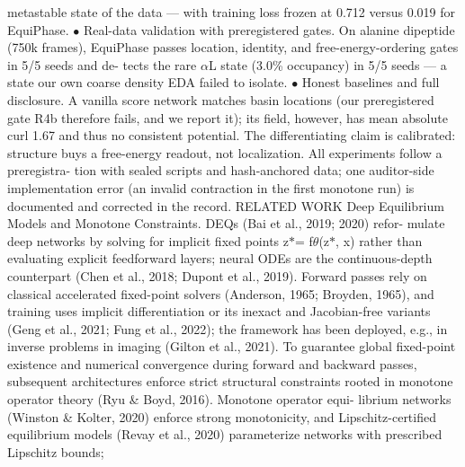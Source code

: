 \documentclass{article}
\begin{document}
metastable state of the data --- with training loss frozen at 0.712 versus 0.019 for EquiPhase.
$\bullet$  Real-data validation with preregistered gates.
On alanine dipeptide (750k frames),
EquiPhase passes location, identity, and free-energy-ordering gates in 5/5 seeds and de-
tects the rare $\alpha$L state (3.0\% occupancy) in 5/5 seeds --- a state our own coarse density
EDA failed to isolate.
$\bullet$  Honest baselines and full disclosure. A vanilla score network matches basin locations
(our preregistered gate R4b therefore fails, and we report it); its field, however, has mean
absolute curl 1.67 and thus no consistent potential. The differentiating claim is calibrated:
structure buys a free-energy readout, not localization. All experiments follow a preregistra-
tion with sealed scripts and hash-anchored data; one auditor-side implementation error (an
invalid contraction in the first monotone run) is documented and corrected in the record.
RELATED WORK
Deep Equilibrium Models and Monotone Constraints.
DEQs (Bai et al., 2019; 2020) refor-
mulate deep networks by solving for implicit fixed points z$*$= f$\theta$(z$*$, x) rather than evaluating
explicit feedforward layers; neural ODEs are the continuous-depth counterpart (Chen et al., 2018;
Dupont et al., 2019). Forward passes rely on classical accelerated fixed-point solvers (Anderson,
1965; Broyden, 1965), and training uses implicit differentiation or its inexact and Jacobian-free
variants (Geng et al., 2021; Fung et al., 2022); the framework has been deployed, e.g., in inverse
problems in imaging (Gilton et al., 2021). To guarantee global fixed-point existence and numerical
convergence during forward and backward passes, subsequent architectures enforce strict structural
constraints rooted in monotone operator theory (Ryu \& Boyd, 2016). Monotone operator equi-
librium networks (Winston \& Kolter, 2020) enforce strong monotonicity, and Lipschitz-certified
equilibrium models (Revay et al., 2020) parameterize networks with prescribed Lipschitz bounds;
\clearpage

\end{document}
